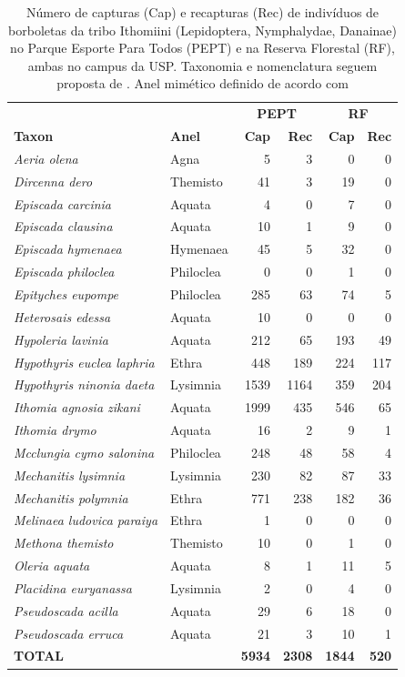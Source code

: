 \documentclass[12pt, A4]{article}
\begin{document}
\begin{table}
  \centering
  \caption{Número de capturas (Cap) e recapturas (Rec) de indivíduos 
    de borboletas da tribo
    Ithomiini (Lepidoptera, Nymphalydae, Danainae) no Parque
    Esporte Para Todos (PEPT) e na Reserva Florestal (RF), ambas no campus da
    USP. Taxonomia e nomenclatura seguem proposta de \citet{Brower_2014}. 
    Anel mimético definido de acordo com \citet{Willmott_2004}}
  \begin{tabular}{llrrrr}
    \toprule
    & &\multicolumn{2}{c}{\textbf{PEPT}} & \multicolumn{2}{c}{\textbf{RF}} \\
    \textbf{Taxon} & \textbf{Anel} & \textbf{Cap} & \textbf{Rec} & \textbf{Cap} & \textbf{Rec}\\
    \midrule
    \emph{Aeria olena} & Agna & 5 & 3 & 0 & 0\\
    \emph{Dircenna dero} & Themisto & 41 & 3 & 19 & 0\\
    \emph{Episcada carcinia} & Aquata & 4 & 0 & 7 & 0\\
    \emph{Episcada clausina} & Aquata & 10 & 1 & 9 & 0\\
    \emph{Episcada hymenaea} & Hymenaea & 45 & 5 & 32 & 0\\
    \emph{Episcada philoclea} & Philoclea & 0 & 0 & 1 & 0\\
    \emph{Epityches eupompe} & Philoclea & 285 & 63 & 74 & 5\\
    \emph{Heterosais edessa} & Aquata & 10 & 0 & 0 & 0\\
    \emph{Hypoleria lavinia} & Aquata & 212 & 65 & 193 & 49\\
    \emph{Hypothyris euclea laphria} & Ethra & 448 & 189 & 224 & 117\\
    \emph{Hypothyris ninonia daeta} & Lysimnia & 1539 & 1164 & 359 & 204\\
    \emph{Ithomia agnosia zikani} & Aquata & 1999 & 435 & 546 & 65\\
    \emph{Ithomia drymo} & Aquata & 16 & 2 & 9 & 1\\
    \emph{Mcclungia cymo salonina} & Philoclea & 248 & 48 & 58 & 4\\
    \emph{Mechanitis lysimnia} & Lysimnia & 230 & 82 & 87 & 33\\
    \emph{Mechanitis polymnia} & Ethra & 771 & 238 & 182 & 36\\
    \emph{Melinaea ludovica paraiya} & Ethra & 1 & 0 & 0 & 0\\
    \emph{Methona themisto} & Themisto & 10 & 0 & 1 & 0\\
    \emph{Oleria aquata} & Aquata & 8 & 1 & 11 & 5\\
    \emph{Placidina euryanassa} & Lysimnia & 2 & 0 & 4 & 0\\
    \emph{Pseudoscada acilla} & Aquata & 29 & 6 & 18 & 0\\
    \emph{Pseudoscada erruca} & Aquata & 21 & 3 & 10 & 1\\
    \textbf{TOTAL} & & \textbf{5934} & \textbf{2308} & \textbf{1844} & \textbf{520}\\
    \bottomrule
  \end{tabular} 
  \label{tab:borb1}
\end{table}
\end{document}

